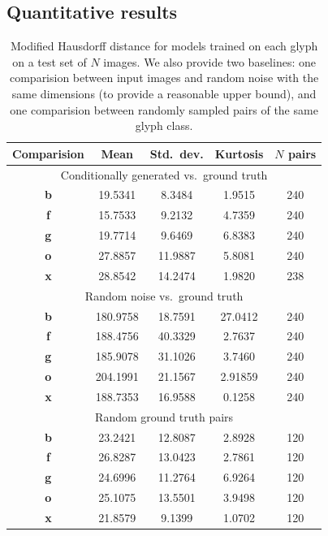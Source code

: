 \subsection{Quantitative results}\label{sec:quant-eval}
\begin{table}[h]
\centering
\caption[Quantitative results for models trained on letter glyphs]
    {Modified Hausdorff distance for models trained on each glyph on a test set of $N$ images.
    We also provide two baselines: one comparision between input images and random noise with the same dimensions (to provide a reasonable upper bound), and one comparision between randomly sampled pairs of the same glyph class.
    \label{tbl:model-results}}
\begin{tabular}{c c c c c}
\toprule
    Comparision & Mean & Std.\ dev. & Kurtosis & $N$ pairs \\ \midrule
    \multicolumn{5}{c}{Conditionally generated vs.\ ground truth} \\ \midrule
    \textbf{b} & 19.5341 & 8.3484 & 1.9515 & 240 \\
    \textbf{f} & 15.7533 & 9.2132 & 4.7359 & 240 \\
    \textbf{g} & 19.7714 & 9.6469 & 6.8383 & 240 \\
    \textbf{o} & 27.8857 & 11.9887 & 5.8081 & 240 \\
    \textbf{x} & 28.8542 & 14.2474 & 1.9820 & 238 \\ \midrule
    \multicolumn{5}{c}{Random noise vs.\ ground truth} \\ \midrule
    \textbf{b} & 180.9758 & 18.7591 & 27.0412 & 240 \\
    \textbf{f} & 188.4756 & 40.3329 & 2.7637 & 240 \\
    \textbf{g} & 185.9078 & 31.1026 & 3.7460 & 240 \\
    \textbf{o} & 204.1991 & 21.1567 & 2.91859 & 240 \\
    \textbf{x} & 188.7353 & 16.9588 & 0.1258 & 240 \\ \midrule
    \multicolumn{5}{c}{Random ground truth pairs} \\ \midrule
    \textbf{b} & 23.2421 & 12.8087 & 2.8928 & 120 \\
    \textbf{f} & 26.8287 & 13.0423 & 2.7861 & 120 \\
    \textbf{g} & 24.6996 & 11.2764 & 6.9264 & 120 \\
    \textbf{o} & 25.1075 & 13.5501 & 3.9498 & 120 \\
    \textbf{x} & 21.8579 & 9.1399 & 1.0702 & 120 \\
\end{tabular}
\end{table}

